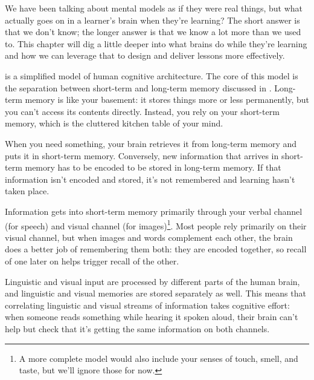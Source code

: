 
We have been talking about mental models as if they were real things,
but what actually goes on in a learner's brain when they're learning?
The short answer is that we don't know;
the longer answer is that we know a lot more than we used to.
This chapter will dig a little deeper into what brains do while they're learning
and how we can leverage that to design and deliver lessons more effectively.



 is a simplified model of human cognitive architecture.
The core of this model is
the separation between short-term and long-term memory discussed in .
Long-term memory is like your basement:
it stores things more or less permanently,
but you can't access its contents directly.
Instead,
you rely on your short-term memory,
which is the cluttered kitchen table of your mind.

When you need something,
your brain retrieves it from long-term memory and puts it in short-term memory.
Conversely,
new information that arrives in short-term memory
has to be encoded to be stored in long-term memory.
If that information isn't encoded and stored,
it's not remembered and learning hasn't taken place.

Information gets into short-term memory primarily through
your verbal channel (for speech)
and visual channel
(for images)\footnote{
  A more complete model
  would also include your senses of touch, smell, and taste,
  but we'll ignore those for now.}.
Most people rely primarily on their visual channel,
but when images and words complement each other,
the brain does a better job of remembering them both:
they are encoded together,
so recall of one later on helps trigger recall of the other.

Linguistic and visual input are processed by different parts of the human brain,
and linguistic and visual memories are stored separately as well.
This means that correlating linguistic and visual streams of information takes cognitive effort:
when someone reads something while hearing it spoken aloud,
their brain can't help but check that it's getting the same information on both channels.

